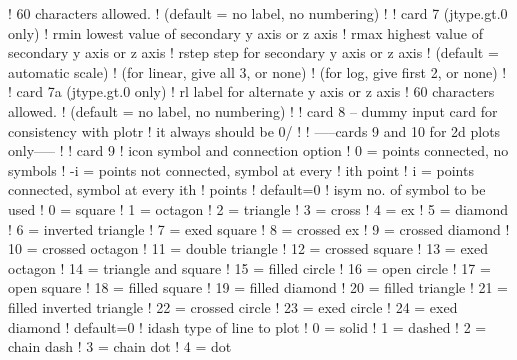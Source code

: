 \begin{ccode}
   !                   60 characters allowed.
   !                   (default = no label, no numbering)
   !
   !  card 7   (jtype.gt.0 only)
   !     rmin          lowest value of secondary y axis or z axis
   !     rmax          highest value of secondary y axis or z axis
   !     rstep         step for secondary y axis or z axis
   !                   (default = automatic scale)
   !                   (for linear, give all 3, or none)
   !                   (for log, give first 2, or none)
   !
   !  card 7a  (jtype.gt.0 only)
   !     rl            label for alternate y axis or z axis
   !                   60 characters allowed.
   !                   (default = no label, no numbering)
   !
   !   card 8  -- dummy input card for consistency with plotr
   !               it always should be 0/
   !
   ! -----cards 9 and 10 for 2d plots only-----
   !
   !   card 9
   !     icon          symbol and connection option
   !                     0 = points connected, no symbols
   !                    -i = points not connected, symbol at every
   !                         ith point
   !                     i = points connected, symbol at every ith
   !                         points
   !                     default=0
   !     isym          no. of symbol to be used
   !                     0 = square
   !                     1 = octagon
   !                     2 = triangle
   !                     3 = cross
   !                     4 = ex
   !                     5 = diamond
   !                     6 = inverted triangle
   !                     7 = exed square
   !                     8 = crossed ex
   !                     9 = crossed diamond
   !                     10 = crossed octagon
   !                     11 = double triangle
   !                     12 = crossed square
   !                     13 = exed octagon
   !                     14 = triangle and square
   !                     15 = filled circle
   !                     16 = open circle
   !                     17 = open square
   !                     18 = filled square
   !                     19 = filled diamond
   !                     20 = filled triangle
   !                     21 = filled inverted triangle
   !                     22 = crossed circle
   !                     23 = exed circle
   !                     24 = exed diamond
   !                     default=0
   !     idash         type of line to plot
   !                     0 = solid
   !                     1 = dashed
   !                     2 = chain dash
   !                     3 = chain dot
   !                     4 = dot

\end{ccode}

